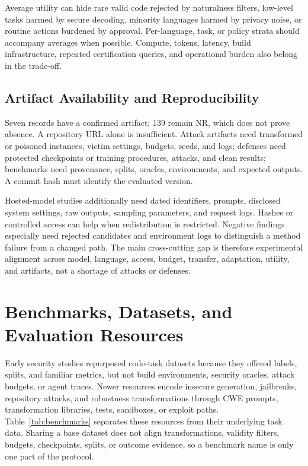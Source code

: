 \documentclass[acmsmall,screen,review]{acmart}
\begin{document}
Average utility can hide rare valid code rejected by naturalness filters, low-level tasks harmed by secure decoding, minority languages harmed by privacy noise, or routine actions burdened by approval. Per-language, task, or policy strata should accompany averages when possible. Compute, tokens, latency, build infrastructure, repeated certification queries, and operational burden also belong in the trade-off.

\subsection{Artifact Availability and Reproducibility}
Seven records have a confirmed artifact; 139 remain \textsf{NR}, which does not prove absence. A repository URL alone is insufficient. Attack artifacts need transformed or poisoned instances, victim settings, budgets, seeds, and logs; defenses need protected checkpoints or training procedures, attacks, and clean results; benchmarks need provenance, splits, oracles, environments, and expected outputs. A commit hash must identify the evaluated version.

Hosted-model studies additionally need dated identifiers, prompts, disclosed system settings, raw outputs, sampling parameters, and request logs. Hashes or controlled access can help when redistribution is restricted. Negative findings especially need rejected candidates and environment logs to distinguish a method failure from a changed path. The main cross-cutting gap is therefore experimental alignment across model, language, access, budget, transfer, adaptation, utility, and artifacts, not a shortage of attacks or defenses.

\section{Benchmarks, Datasets, and Evaluation Resources} \label{sec:eval}

Early security studies repurposed code-task datasets because they offered labels, splits, and familiar metrics, but not build environments, security oracles, attack budgets, or agent traces. Newer resources encode insecure generation, jailbreaks, repository attacks, and robustness transformations through CWE prompts, transformation libraries, tests, sandboxes, or exploit paths. Table~\ref{tab:benchmarks} separates these resources from their underlying task data. Sharing a base dataset does not align transformations, validity filters, budgets, checkpoints, splits, or outcome evidence, so a benchmark name is only one part of the protocol.
\end{document}
